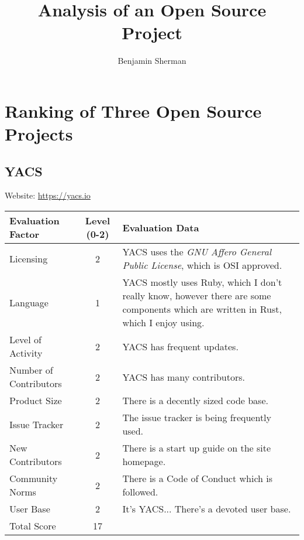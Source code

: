 \documentclass[11pt]{article}
\title{\vspace{-2.0cm}\bf Analysis of an Open Source Project}
\author{Benjamin Sherman}
\date{}
\begin{document}
\maketitle

\section{Ranking of Three Open Source Projects}
\subsection{YACS}
\nopagebreak
Website: \url{https://yacs.io}
\nopagebreak
\begin{center}
\begin{tabularx}{\textwidth}{|l|c|X|}
	\hline
	\textbf{Evaluation Factor} & \textbf{Level (0-2)} & \textbf{Evaluation Data} \\\hline
	Licensing & 2 & YACS uses the \textit{GNU Affero General Public License}, which is OSI approved.\\\hline
	Language & 1 & YACS mostly uses Ruby, which I don't really know, however there are some components which are written in Rust, which I enjoy using.\\\hline
	Level of Activity & 2 & YACS has frequent updates.\\\hline
	Number of Contributors & 2 & YACS has many contributors.\\\hline
	Product Size & 2 & There is a decently sized code base.\\\hline
	Issue Tracker & 2 & The issue tracker is being frequently used.\\\hline
	New Contributors & 2 & There is a start up guide on the site homepage.\\\hline
	Community Norms & 2 & There is a Code of Conduct which is followed.\\\hline
	User Base & 2 & It's YACS... There's a devoted user base.\\\hline
	Total Score & 17 & \\\hline
\end{tabularx}
\end{center}

\end{document}
